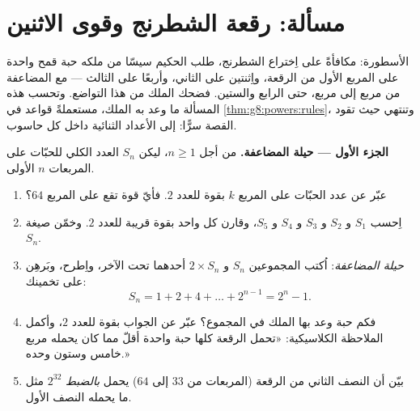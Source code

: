 \section{مسألة: رقعة الشطرنج وقوى الاثنين}

\begin{problem}[{مسألة نهاية الأسبوع --- \omterm{def:g1:addition:def}{المجموع} الهندسي
$1 + 2 + 4 + \dots + 2^{n-1} = 2^n - 1$، من أسطورة مشهورة إلى
الأعداد الثنائية}]
\label{pb:g8:powers:1}
الأسطورة: مكافأةً على اِختراع الشطرنج، طلب الحكيم سيسّا
من ملكه حبة قمح واحدة على المربع الأول من الرقعة،
واِثنتين على الثاني، وأربعًا على الثالث --- مع المضاعفة من مربع إلى
مربع، حتى الرابع والستين. فضحك الملك من هذا التواضع.
وتحسب هذه المسألة ما وعد به الملك، مستعملةً قواعد 
في \cref{thm:g8:powers:rules}، وتنتهي حيث تقود القصة
سرًّا: إلى الأعداد الثنائية داخل كل حاسوب.

\medskip
\noindent\textbf{الجزء الأول --- حيلة المضاعفة.}
من أجل $n \geq 1$، ليكن $S_n$ العدد الكلي للحبّات على المربعات
$n$ الأولى.
\begin{enumerate}
  \item عبّر عن عدد الحبّات على المربع $k$ بقوة للعدد
        $2$. فأيّ قوة تقع على المربع $64$؟
  \item اِحسب $S_1$ و $S_2$ و $S_3$ و $S_4$ و $S_5$، وقارن
        كل واحد بقوة قريبة للعدد $2$. وخمّن صيغة
         $S_n$.
  \item \emph{حيلة المضاعفة}: اُكتب المجموعين $S_n$ و
        $2 \times S_n$ أحدهما تحت الآخر، واِطرح، وبَرهِن على
        تخمينك:
        \[
        S_n = 1 + 2 + 4 + \dots + 2^{n-1} = 2^n - 1 .
        \]
  \item فكم حبة وعد بها الملك في المجموع؟ عبّر عن
        الجواب بقوة للعدد $2$، وأكمل الملاحظة
        الكلاسيكية: «تحمل الرقعة كلها حبة واحدة أقلّ مما
        كان يحمله مربع خامس وستون وحده.»
  \item بيّن أن النصف الثاني من الرقعة (المربعات من $33$ إلى
        $64$) يحمل \emph{بالضبط} $2^{32}$ مثل ما يحمله
        النصف الأول.
\end{enumerate}


\end{problem}
